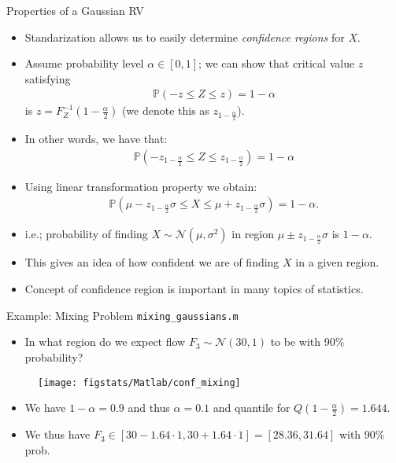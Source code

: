 \documentclass[9pt]{beamer}
\begin{document}
%
\begin{frame}{Properties of a Gaussian RV}

\begin{itemize}
\setlength{\itemsep}{10pt}
\item Standarization allows us to easily determine {\em confidence regions} for $X$.

\item Assume probability level $\alpha \in [0,1]$; we can show that critical value $z$ satisfying
\begin{align*}
\mathbb{P}(-z\leq Z\leq z)=1-\alpha
\end{align*}
is $z=F_Z^{-1}(1-\frac{\alpha}{2})$ (we denote this as $z_{1-\frac{\alpha}{2}}$). 
\item In other words, we have that:
\begin{align*}
\mathbb{P}(-z_{1-\frac{\alpha}{2}}\leq Z\leq z_{1-\frac{\alpha}{2}})=1-\alpha
\end{align*} 
\item Using linear transformation property we obtain:
\begin{align*}
\mathbb{P}(\mu-z_{1-\frac{\alpha}{2}}\sigma\leq X\leq \mu+z_{1-\frac{\alpha}{2}}\sigma)=1-\alpha.
\end{align*}
\item i.e.; probability of finding $X\sim\mathcal{N}(\mu,\sigma^2)$ in region $\mu\pm z_{1-\frac{\alpha}{2}}\sigma$ is $1-\alpha$. 
\item This gives an idea of how confident we are of finding $X$ in a given region.

\item Concept of confidence region is important in many topics of statistics. 
\end{itemize}
\end{frame}

\begin{frame}{Example: Mixing Problem \footnotesize{\texttt{mixing\_gaussians.m}}}
\begin{itemize}
\item In what region do we expect flow $F_3\sim\mathcal{N}(30,1)$ to be with 90\% probability? 
\end{itemize}
\begin{figure}[!htb]
    \centering
	\texttt{[image: figstats/Matlab/conf\_mixing]}
\end{figure}
\begin{itemize}
\item We have $1-\alpha=0.9$ and thus $\alpha=0.1$ and quantile for $Q(1-\frac{\alpha}{2})=1.644$.
\item We thus have $F_3\in [30-1.64\cdot 1,30+1.64\cdot 1]=[28.36,31.64]$ with 90\% prob. 
\end{itemize}
\end{frame}
\end{document}
